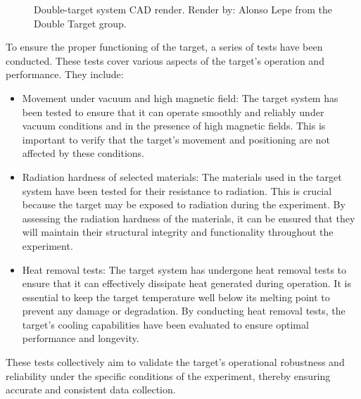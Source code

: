     \begin{figure}[b!]
        \centering{}
        \caption[Double-target system.]{Double-target system CAD render.
        Render by: Alonso Lepe from the Double Target group.}
        \label{fig::11.300::double_target}
    \end{figure}

    To ensure the proper functioning of the target, a series of tests have been conducted.
    These tests cover various aspects of the target's operation and performance.
    They include:

    \begin{itemize}
        \item
            Movement under vacuum and high magnetic field:
            The target system has been tested to ensure that it can operate smoothly and reliably under vacuum conditions and in the presence of high magnetic fields.
            This is important to verify that the target's movement and positioning are not affected by these conditions.

        \item
            Radiation hardness of selected materials:
            The materials used in the target system have been tested for their resistance to radiation.
            This is crucial because the target may be exposed to radiation during the experiment.
            By assessing the radiation hardness of the materials, it can be ensured that they will maintain their structural integrity and functionality throughout the experiment.

        \item
            Heat removal tests:
            The target system has undergone heat removal tests to ensure that it can effectively dissipate heat generated during operation.
            It is essential to keep the target temperature well below its melting point to prevent any damage or degradation.
            By conducting heat removal tests, the target's cooling capabilities have been evaluated to ensure optimal performance and longevity.
    \end{itemize}

    These tests collectively aim to validate the target's operational robustness and reliability under the specific conditions of the experiment, thereby ensuring accurate and consistent data collection.

    
